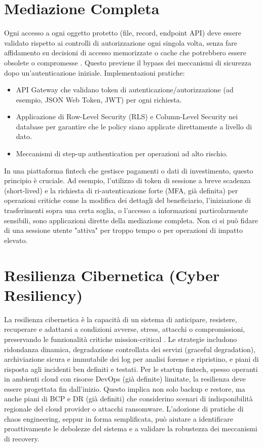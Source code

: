 \section{Mediazione Completa}
Ogni accesso a ogni oggetto protetto (file, record, endpoint API) deve essere validato rispetto ai controlli di autorizzazione ogni singola volta, senza fare affidamento su decisioni di accesso memorizzate o cache che potrebbero essere obsolete o compromesse \cite{Saltzer_Schroeder_1975}. Questo previene il bypass dei meccanismi di sicurezza dopo un'autenticazione iniziale.
Implementazioni pratiche:
\begin{itemize}
\item API Gateway che validano token di autenticazione/autorizzazione (ad esempio, JSON Web Token, JWT) per ogni richiesta.
\item Applicazione di Row-Level Security (RLS) e Column-Level Security nei database per garantire che le policy siano applicate direttamente a livello di dato.
\item Meccanismi di step-up authentication per operazioni ad alto rischio.
\end{itemize}
In una piattaforma fintech che gestisce pagamenti o dati di investimento, questo principio è cruciale. Ad esempio, l'utilizzo di token di sessione a breve scadenza (short-lived) e la richiesta di ri-autenticazione forte (MFA, già definita) per operazioni critiche come la modifica dei dettagli del beneficiario, l'iniziazione di trasferimenti sopra una certa soglia, o l'accesso a informazioni particolarmente sensibili, sono applicazioni dirette della mediazione completa. Non ci si può fidare di una sessione utente "attiva" per troppo tempo o per operazioni di impatto elevato.
\section{Resilienza Cibernetica (Cyber Resiliency)}
La resilienza cibernetica è la capacità di un sistema di anticipare, resistere, recuperare e adattarsi a condizioni avverse, stress, attacchi o compromissioni, preservando le funzionalità critiche mission-critical \cite{NIST_SP_800_160v2_2019}. Le strategie includono ridondanza dinamica, degradazione controllata dei servizi (graceful degradation), archiviazione sicura e immutabile dei log per analisi forense e ripristino, e piani di risposta agli incidenti ben definiti e testati.
Per le startup fintech, spesso operanti in ambienti cloud con risorse DevOps (già definite) limitate, la resilienza deve essere progettata fin dall'inizio. Questo implica non solo backup e restore, ma anche piani di BCP e DR (già definiti) che considerino scenari di indisponibilità regionale del cloud provider o attacchi ransomware. L'adozione di pratiche di chaos engineering, seppur in forma semplificata, può aiutare a identificare proattivamente le debolezze del sistema e a validare la robustezza dei meccanismi di recovery.
